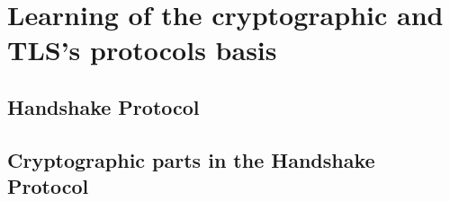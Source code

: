\chapter{Learning of the cryptographic and TLS's protocols basis}

\section{Handshake Protocol}

\section{Cryptographic parts in the Handshake Protocol}
